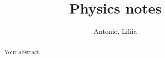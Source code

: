\documentclass{report}
\title{Physics notes}
\author{Antonio, Liliia}
\begin{document}
\maketitle

\begin{abstract}
Your abstract.
\end{abstract}



\end{document}
